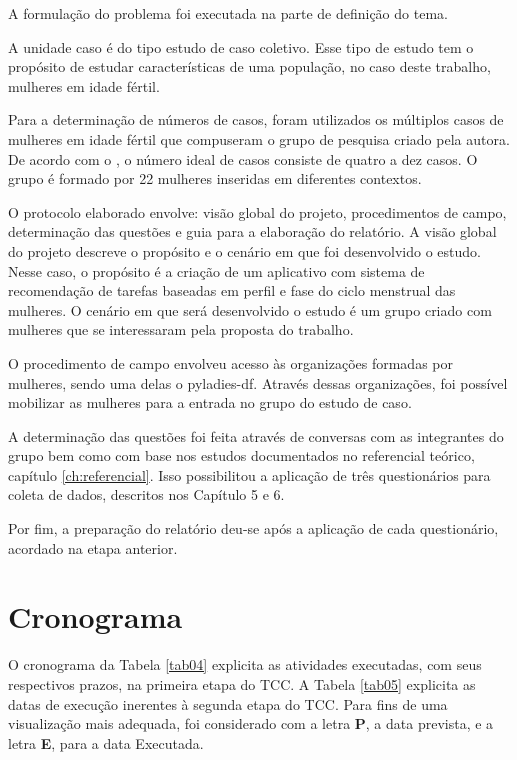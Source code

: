 A formulação do problema foi executada na parte de definição do tema.

A unidade caso é do tipo estudo de caso coletivo. Esse tipo de estudo tem o propósito de estudar características
de uma população, no caso deste trabalho, mulheres em idade fértil.

Para a determinação de números de casos, foram utilizados os múltiplos casos de mulheres em idade fértil que compuseram o grupo de pesquisa criado pela autora. De acordo com o , 
o número ideal de casos consiste de quatro a dez casos. O grupo é formado por 22 mulheres inseridas em diferentes contextos.

O protocolo elaborado envolve: visão global do projeto, procedimentos de campo, determinação das questões e guia para a elaboração do relatório.
A visão global do projeto descreve o propósito e o cenário em que foi desenvolvido o estudo. Nesse caso, o propósito é a criação de um aplicativo com sistema de recomendação de tarefas baseadas 
em perfil e fase do ciclo menstrual das mulheres. O cenário em que será desenvolvido o estudo é um grupo criado com mulheres que se interessaram pela proposta do trabalho.

O procedimento de campo envolveu acesso às organizações formadas por mulheres, sendo uma delas o pyladies-df. Através dessas organizações, foi possível mobilizar as mulheres 
para a entrada no grupo do estudo de caso.

A determinação das questões foi feita através de conversas com as 
integrantes do grupo bem como com base nos estudos documentados no 
referencial teórico, capítulo \ref{ch:referencial}. Isso possibilitou a aplicação de 
três questionários para coleta de dados, descritos nos Capítulo 5 e 6.

Por fim, a preparação do relatório deu-se após a aplicação de cada questionário, acordado na etapa anterior.

\section{Cronograma}
\label{46}


O cronograma da Tabela \ref{tab04} explicita as atividades executadas, 
com seus respectivos prazos, na primeira etapa do TCC. A Tabela \ref{tab05} explicita as datas 
de execução inerentes à segunda etapa do TCC. Para fins de uma visualização mais adequada, 
foi considerado com a letra \textbf{P}, a data prevista, e a letra \textbf{E},
para a data Executada.

